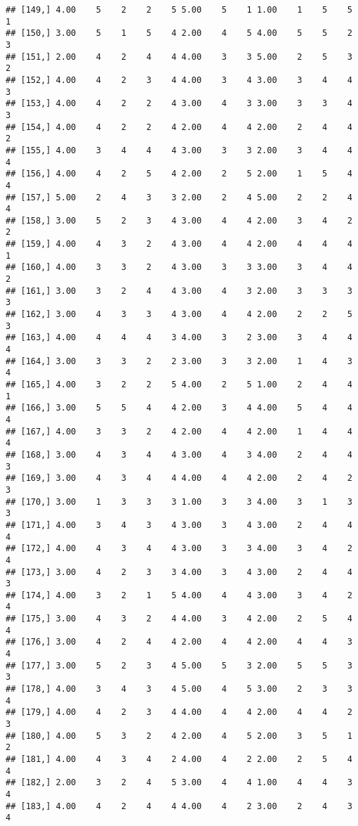 \documentclass[]{article}
\begin{document}
\begin{verbatim}
## [149,] 4.00    5    2    2    5 5.00    5    1 1.00    1    5    5    1
## [150,] 3.00    5    1    5    4 2.00    4    5 4.00    5    5    2    3
## [151,] 2.00    4    2    4    4 4.00    3    3 5.00    2    5    3    2
## [152,] 4.00    4    2    3    4 4.00    3    4 3.00    3    4    4    3
## [153,] 4.00    4    2    2    4 3.00    4    3 3.00    3    3    4    3
## [154,] 4.00    4    2    2    4 2.00    4    4 2.00    2    4    4    2
## [155,] 4.00    3    4    4    4 3.00    3    3 2.00    3    4    4    4
## [156,] 4.00    4    2    5    4 2.00    2    5 2.00    1    5    4    4
## [157,] 5.00    2    4    3    3 2.00    2    4 5.00    2    2    4    4
## [158,] 3.00    5    2    3    4 3.00    4    4 2.00    3    4    2    2
## [159,] 4.00    4    3    2    4 3.00    4    4 2.00    4    4    4    1
## [160,] 4.00    3    3    2    4 3.00    3    3 3.00    3    4    4    2
## [161,] 3.00    3    2    4    4 3.00    4    3 2.00    3    3    3    3
## [162,] 3.00    4    3    3    4 3.00    4    4 2.00    2    2    5    3
## [163,] 4.00    4    4    4    3 4.00    3    2 3.00    3    4    4    4
## [164,] 3.00    3    3    2    2 3.00    3    3 2.00    1    4    3    4
## [165,] 4.00    3    2    2    5 4.00    2    5 1.00    2    4    4    1
## [166,] 3.00    5    5    4    4 2.00    3    4 4.00    5    4    4    4
## [167,] 4.00    3    3    2    4 2.00    4    4 2.00    1    4    4    4
## [168,] 3.00    4    3    4    4 3.00    4    3 4.00    2    4    4    3
## [169,] 3.00    4    3    4    4 4.00    4    4 2.00    2    4    2    3
## [170,] 3.00    1    3    3    3 1.00    3    3 4.00    3    1    3    3
## [171,] 4.00    3    4    3    4 3.00    3    4 3.00    2    4    4    4
## [172,] 4.00    4    3    4    4 3.00    3    3 4.00    3    4    2    4
## [173,] 3.00    4    2    3    3 4.00    3    4 3.00    2    4    4    3
## [174,] 4.00    3    2    1    5 4.00    4    4 3.00    3    4    2    4
## [175,] 3.00    4    3    2    4 4.00    3    4 2.00    2    5    4    4
## [176,] 3.00    4    2    4    4 2.00    4    4 2.00    4    4    3    4
## [177,] 3.00    5    2    3    4 5.00    5    3 2.00    5    5    3    3
## [178,] 4.00    3    4    3    4 5.00    4    5 3.00    2    3    3    4
## [179,] 4.00    4    2    3    4 4.00    4    4 2.00    4    4    2    3
## [180,] 4.00    5    3    2    4 2.00    4    5 2.00    3    5    1    2
## [181,] 4.00    4    3    4    2 4.00    4    2 2.00    2    5    4    4
## [182,] 2.00    3    2    4    5 3.00    4    4 1.00    4    4    3    4
## [183,] 4.00    4    2    4    4 4.00    4    2 3.00    2    4    3    4

\end{verbatim}
\end{document}
